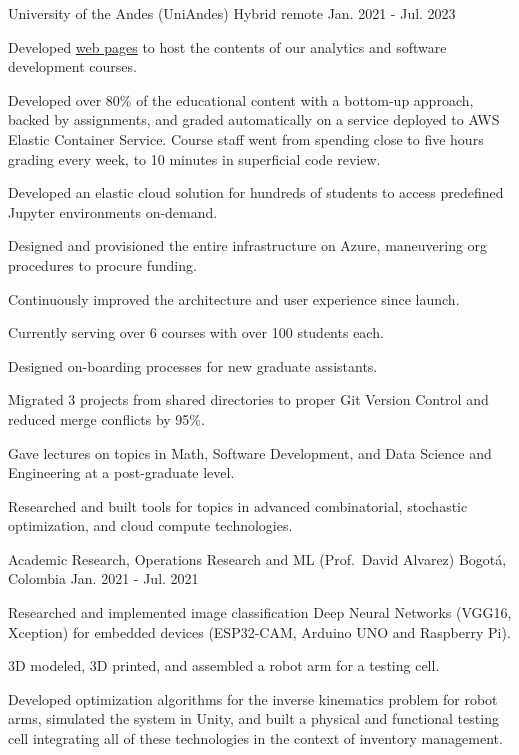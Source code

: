 \begin{cventries}
	{University of the Andes (UniAndes)} %
	{Hybrid remote} %
	{Jan. 2021 {-} Jul. 2023} %
	{
		\begin{cvitems} %
			\item {Developed \href{https://copa-uniandes.github.io/PAD-web-tutorials/intro.html}{web pages} to host the contents of our analytics and software development courses.}
			\item {Developed over 80\% of the educational content with a bottom-up approach, backed by assignments, and graded automatically on a service deployed to AWS Elastic Container Service. Course staff went from spending close to five hours grading every week, to 10 minutes in superficial code review.}
			\item {Developed an elastic cloud solution for hundreds of students to access predefined Jupyter environments on-demand.}
			\item {Designed and provisioned the entire infrastructure on Azure, maneuvering org procedures to procure funding.}
			\item {Continuously improved the architecture and user experience since launch.}
			\item {Currently serving over 6 courses with over 100 students each.}
			\item {Designed on-boarding processes for new graduate assistants.}
			\item {Migrated 3 projects from shared directories to proper Git Version Control and reduced merge conflicts by 95\%.}
			\item {Gave lectures on topics in Math, Software Development, and Data Science and Engineering at a post-graduate level.}
			\item {Researched and built tools for topics in advanced combinatorial, stochastic optimization, and cloud compute technologies.}
		\end{cvitems}
	}

	{Academic Research, Operations Research and ML (Prof.\ David Alvarez)} %
	{Bogotá, Colombia} %
	{Jan. 2021 {-} Jul. 2021} %
	{
		\begin{cvitems} %
			\item {Researched and implemented image classification Deep Neural Networks (VGG16, Xception) for embedded devices (ESP32-CAM, Arduino UNO and Raspberry Pi).}
			\item {3D modeled, 3D printed, and assembled a robot arm for a testing cell.}
			\item {Developed optimization algorithms for the inverse kinematics problem for robot arms, simulated the system in Unity, and built a physical and functional testing cell integrating all of these technologies in the context of inventory management.}
		\end{cvitems}
	}


\end{cventries}
